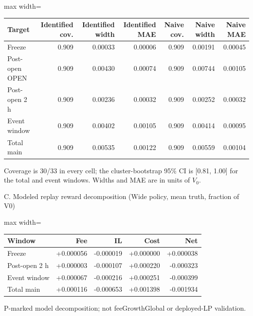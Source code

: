 \begin{table}[!ht]
\begin{adjustbox}{max width=\linewidth}
\begin{tabular}{@{}lrrrrrr@{}}
\toprule
Target & Identified cov. & Identified width & Identified MAE & Naive cov. & Naive width & Naive MAE \\
\midrule
Freeze & 0.909 & 0.00033 & 0.00006 & 0.909 & 0.00191 & 0.00045 \\
Post-open OPEN & 0.909 & 0.00430 & 0.00074 & 0.909 & 0.00744 & 0.00105 \\
Post-open 2 h & 0.909 & 0.00236 & 0.00032 & 0.909 & 0.00252 & 0.00032 \\
Event window & 0.909 & 0.00402 & 0.00105 & 0.909 & 0.00414 & 0.00095 \\
Total main & 0.909 & 0.00535 & 0.00122 & 0.909 & 0.00559 & 0.00104 \\
\bottomrule
\end{tabular}
\end{adjustbox}
\vspace{0.5em}
\par\noindent\begin{minipage}{\linewidth}\raggedright{\scriptsize Coverage is 30/33 in every cell; the cluster-bootstrap 95\% CI is [0.81, 1.00] for the total and event windows. Widths and MAE are in units of $V_0$.}\end{minipage}\par

\par\noindent\begin{minipage}{\linewidth}\raggedright{\scriptsize C. Modeled replay reward decomposition (Wide policy, mean truth, fraction of V0)}\end{minipage}\par

\begin{adjustbox}{max width=\linewidth}
\begin{tabular}{@{}lrrrr@{}}
\toprule
Window & Fee & IL & Cost & Net \\
\midrule
Freeze & +0.000056 & -0.000019 & +0.000000 & +0.000038 \\
Post-open 2 h & +0.000003 & -0.000107 & +0.000220 & -0.000323 \\
Event window & +0.000067 & -0.000216 & +0.000251 & -0.000399 \\
Total main & +0.000116 & -0.000653 & +0.001398 & -0.001934 \\
\bottomrule
\end{tabular}
\end{adjustbox}
\vspace{0.5em}
\par\noindent\begin{minipage}{\linewidth}\raggedright{\scriptsize P-marked model decomposition; not feeGrowthGlobal or deployed-LP validation.}\end{minipage}\par


\end{table}
